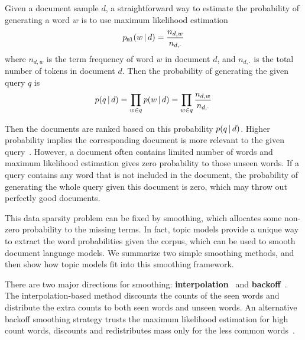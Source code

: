 Given a document sample $d$, a straightforward way to estimate the
probability of generating a word $w$ is to use maximum likelihood
estimation
\begin{align}
p_{\texttt{ml}}(w \, | \, d) = \frac{n_{d,w}}{n_{d,\cdot}}
\label{eq:ir_mse}
\end{align}
where $n_{d,w}$ is the term frequency of word $w$ in document $d$, and
$n_{d,\cdot}$ is the total number of tokens in document $d$. Then the
probability of generating the given query $q$ is
\begin{align}
p(q \, | \, d) = \prod_{w \in q} p(w \, | \, d) = \prod_{w \in q} \frac{n_{d,w}}{n_{d,\cdot}}
\end{align}

Then the documents are ranked based on this probability $p(q \, | \, d)$. Higher
probability implies the corresponding document is more relevant to the
given query~\citep{song-99}. However, a document often contains limited number of words and
maximum likelihood estimation gives zero probability to those unseen words.
If a query contains any word that is not included in the document, the probability
of generating the whole query given this document is zero, which may throw out perfectly good documents.

This data sparsity problem can be fixed by smoothing, which allocates
some non-zero probability to the missing terms. In fact, topic models
provide a unique way to extract the word probabilities given the
corpus, which can be used to smooth document language models.  We
summarize two simple smoothing methods, and then show how topic models
fit into this smoothing framework.



There are two major directions for smoothing:
\textbf{interpolation}~\citep{Jelinek-1980,mackay95dirichlet,Ney-1994,PonteCroft,zhai-01}
and \textbf{backoff}~\citep{katz-87,song-99}. The interpolation-based
method discounts the counts of the seen words and distribute the extra
counts to both seen words and unseen words. An alternative backoff
smoothing strategy trusts the maximum likelihood estimation for high
count words, discounts and redistributes mass only for the less common
words~\citep{zhai-01}.

